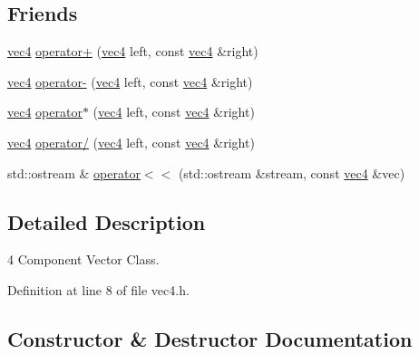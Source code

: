 \subsection*{Friends}
\begin{DoxyCompactItemize}
\item 
\hyperlink{structspork_1_1maths_1_1vec4}{vec4} \hyperlink{structspork_1_1maths_1_1vec4_a9ec62ee0886928c55c9b6f0288c73c60}{operator+} (\hyperlink{structspork_1_1maths_1_1vec4}{vec4} left, const \hyperlink{structspork_1_1maths_1_1vec4}{vec4} \&right)
\item 
\hyperlink{structspork_1_1maths_1_1vec4}{vec4} \hyperlink{structspork_1_1maths_1_1vec4_aefbcaef8da779dca955172b3245c56b0}{operator-\/} (\hyperlink{structspork_1_1maths_1_1vec4}{vec4} left, const \hyperlink{structspork_1_1maths_1_1vec4}{vec4} \&right)
\item 
\hyperlink{structspork_1_1maths_1_1vec4}{vec4} \hyperlink{structspork_1_1maths_1_1vec4_a37d87fd93437b19bb5227e993e55e01f}{operator$\ast$} (\hyperlink{structspork_1_1maths_1_1vec4}{vec4} left, const \hyperlink{structspork_1_1maths_1_1vec4}{vec4} \&right)
\item 
\hyperlink{structspork_1_1maths_1_1vec4}{vec4} \hyperlink{structspork_1_1maths_1_1vec4_a5a0b11e86fa22f63a08a7e7c21cfcc83}{operator/} (\hyperlink{structspork_1_1maths_1_1vec4}{vec4} left, const \hyperlink{structspork_1_1maths_1_1vec4}{vec4} \&right)
\item 
std\+::ostream \& \hyperlink{structspork_1_1maths_1_1vec4_a681ad2aa75c7af77ed633bb251150a70}{operator$<$$<$} (std\+::ostream \&stream, const \hyperlink{structspork_1_1maths_1_1vec4}{vec4} \&vec)
\end{DoxyCompactItemize}


\subsection{Detailed Description}
4 Component Vector Class. 

Definition at line 8 of file vec4.\+h.



\subsection{Constructor \& Destructor Documentation}
\mbox{\label{structspork_1_1maths_1_1vec4_a5c926bcafe3b59dc052f38c5fd4b37de}} 
